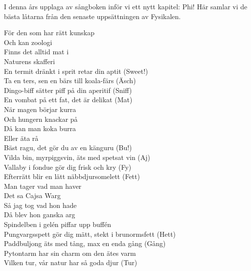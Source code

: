 \documentclass[a6paper, 10pt, twoside]{article}
\begin{document}
\noindent
{}
\small
\vspace{10pt}

\noindent
\small
I denna års upplaga av sångboken inför vi ett nytt kapitel: Phi! Här samlar vi de bästa låtarna från den senaste uppsättningen av Fysikalen. 


\begin{center}
\end{center}
\begin{lyrics}
För den som har rätt kunskap\\
Och kan zoologi\\
Finns det alltid mat i\\
Naturens skafferi
\vspace{5pt}\\
En termit dränkt i sprit retar din aptit (Sweet!)\\
Ta en ters, sen en bärs till koala-färs (Äsch)\\
Dingo-biff sätter piff på din aperitif (Sniff)\\
En vombat på ett fat, det är delikat (Mat)
\vspace{5pt}\\
När magen börjar kurra\\
Och hungern knackar på\\
Då kan man koka burra\\
Eller äta rå
\vspace{5pt}\\
Bäst ragu, det gör du av en känguru (Bu!)\\
Vilda bin, myrpiggsvin, äts med spetsat vin (Aj)\\
Vallaby i fondue gör dig frisk och kry (Fy)\\
Efterrätt blir en lätt näbbdjursomelett (Fett)
\vspace{5pt}\\
Man tager vad man haver\\
Det sa Cajsa Warg\\
Så jag tog vad hon hade\\
Då blev hon ganska arg
\vspace{5pt}\\
Spindelben i gelén piffar upp buffén\\
Pungvargsspett gör dig mätt, stekt i brunormsfett (Hett)\\
Paddbuljong äts med tång, max en enda gång (Gång)\\
Pytontarm har sin charm om den ätes varm\\
Vilken tur, vår natur har så goda djur (Tur)
\end{lyrics}
\end{document}

